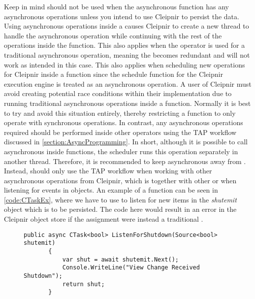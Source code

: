 Keep in mind  should not be used when the asynchronous function has any asynchronous operations unless you intend to use Cleipnir to persist the data. Using asynchronous operations inside a  causes Cleipnir to create a new thread to handle the asynchronous operation while continuing with the rest of the operations inside the function. This also applies when the  operator is used for a traditional asynchronous operation, meaning the  becomes redundant and will not work as intended in this case. This also applies when scheduling new operations for Cleipnir inside a  function since the schedule function for the Cleipnir execution engine is treated as an asynchronous operation. A user of Cleipnir must avoid creating potential race conditions within their implementation due to running traditional asynchronous operations inside a  function. Normally it is best to try and avoid this situation entirely, thereby restricting a  function to only operate with synchronous operations. In contrast, any asynchronous operations required should be performed inside other  operators using the TAP workflow discussed in \autoref{section:AsyncProgramming}. In short, although it is possible to call asynchronous  inside  functions, the scheduler runs this operation separately in another thread. Therefore, it is recommended to keep asynchronous  away from . Instead,  should only use the TAP workflow when working with other asynchronous operations from Cleipnir, which is together with other  or when listening for events in  objects. An example of a  function can be seen in \autoref{code:CTaskEx}, where we have to use  to listen for new items in the \emph{shutemit}  object which is to be persisted. The code here would result in an error in the Cleipnir object store if the  assignment were instead a traditional .

\begin{figure}[h]
	\centering
	\begin{lstlisting}[label = code:CTaskEx, caption= Example of a CTask function, captionpos = b, basicstyle=\scriptsize]
	public async CTask<bool> ListenForShutdown(Source<bool> shutemit)
       {
           var shut = await shutemit.Next();
           Console.WriteLine("View Change Received Shutdown");
           return shut;
       }
	\end{lstlisting}
\end{figure}

